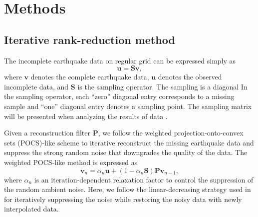\section*{Methods}
\subsection*{Iterative rank-reduction method} The incomplete earthquake data on  regular grid can be expressed simply as
\begin{equation}
\label{eq:dsamp}
\mathbf{u}=\mathbf{S}\mathbf{v},
\end{equation}
where $\mathbf{v}$ denotes the complete earthquake data, $\mathbf{u}$ denotes the observed incomplete data, and $\mathbf{S}$ is the sampling operator.  The sampling  is a diagonal   In the sampling operator, each ``zero'' diagonal entry corresponds to a missing sample and ``one'' diagonal entry denotes a sampling point. The sampling matrix will be presented when analyzing the results of data . 

Given a reconstruction filter $\mathbf{P}$, we follow the weighted projection-onto-convex sets (POCS)-like scheme to iterative reconstruct the missing earthquake data and suppress the strong random noise that downgrades the quality of the data. The weighted POCS-like method is expressed as
\begin{equation}
\label{eq:wpocs}
\mathbf{v}_n  = \alpha_n\mathbf{u} + (1-\alpha_n\mathbf{S}) \mathbf{P} \mathbf{v}_{n-1},
\end{equation}
where $\alpha_n$ is an iteration-dependent relaxation factor to control the suppression of the random ambient noise. Here, we follow the linear-decreasing strategy used in  \cite{yangkang2016irr5d} for iteratively suppressing the noise while restoring the noisy data with newly interpolated data. 

